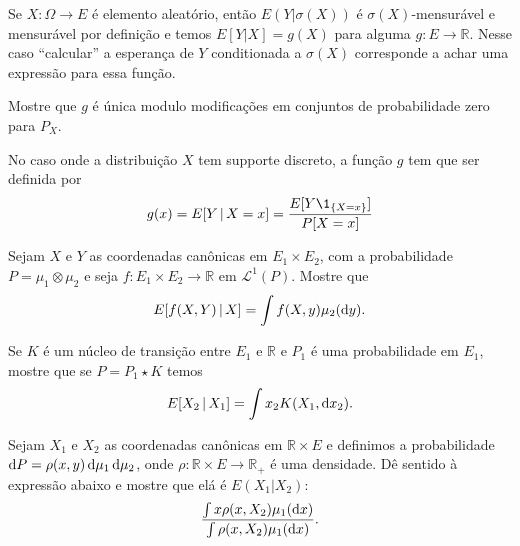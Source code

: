Se $X: \Omega \to E$ é elemento aleatório, então $E(Y|\sigma(X))$ é $\sigma(X)$-mensurável e mensurável por definição e temos
$E[Y| X] = g(X)$ para alguma $g: E \to \mathbb{R}$.
Nesse caso ``calcular'' a esperança de $Y$ conditionada a $\sigma(X)$ corresponde a achar uma expressão para essa função. 

\begin{exercise}
  Mostre que $g$ é única modulo modificações em conjuntos de probabilidade zero para $P_X$. 
\end{exercise}

No caso onde a distribuição $X$ tem supporte discreto, a função $g$ tem que ser definida por 
$$g(x)=E[Y \, | \, X = x]= \frac{E[Y\1_{\{X=x\}}]}{P[X=x]}$$


% 

\begin{exercise}
  Sejam $X$ e $Y$ as coordenadas canônicas em $E_1 \times E_2$, com a probabilidade $P = \mu_1 \otimes \mu_2$ e seja $f:E_1 \times E_2 \to \mathbb{R}$
  em $\mathcal{L}^1(P)$.
  Mostre que
  \begin{equation}
     E[ f(X,Y) \,| \, X] = \int f(X, y) \mu_2(\mathop{}\!\mathrm{d} y).
  \end{equation}
\end{exercise}

\begin{exercise}
  Se $K$ é um núcleo de transição entre $E_1$ e $\mathbb{R}$ e $P_1$ é uma probabilidade em $E_1$, mostre que se $P=P_1 \star K$ temos
  \begin{equation}
    E[ X_2 \, | \, X_1] = \int x_2 K(X_1, \mathop{}\!\mathrm{d} x_2).
  \end{equation}
\end{exercise}


\begin{exercise}
  Sejam $X_1$ e $X_2$ as coordenadas canônicas em $\mathbb{R} \times E$ e definimos a probabilidade $\mathop{}\!\mathrm{d} P = \rho(x,y) \mathop{}\!\mathrm{d} \mu_1 \mathop{}\!\mathrm{d} \mu_2$, onde $\rho:\mathbb{R} \times E \to \mathbb{R}_+$ é uma densidade.
  Dê sentido à expressão abaixo e mostre que elá é $E(X_1|X_2)$:
  \begin{equation}
     \frac{\int x\rho(x, X_2) \mu_1(\mathop{}\!\mathrm{d} x)}{\int \rho(x, X_2) \mu_1(\mathop{}\!\mathrm{d} x)}.
  \end{equation}
\end{exercise}




